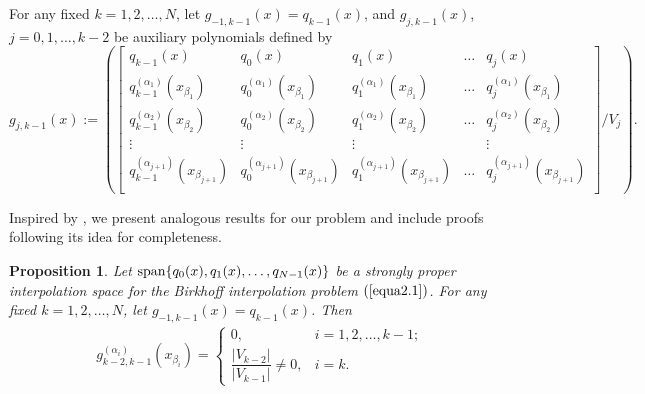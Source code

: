 \documentclass[preprint,12pt]{elsarticle}
\newtheorem{proposition}[theorem]{Proposition}
\begin{document}
For any fixed $k=1,2,\dots,N$, let $g_{-1,k-1}(x)=q_{k-1}(x)$, and $g_{j,k-1}(x)$, $j=0,1,\dots,k-2$ be auxiliary polynomials defined by
\begin{equation}\label{equa3.3}
g_{j,k-1}(x):= \left(\left[\begin{array}{c|cccc}
            q_{k-1}(x) & q_0(x) & q_1(x) & \dots & q_{j}(x) \\ \hline
            q_{k-1}^{(\alpha_1)}(x_{\beta_1}) & q_0^{(\alpha_1)}(x_{\beta_1}) & q_1^{(\alpha_1)}(x_{\beta_1}) & \dots & q_{j}^{(\alpha_1)}(x_{\beta_1}) \\
            q_{k-1}^{(\alpha_2)}(x_{\beta_2}) & q_0^{(\alpha_2)}(x_{\beta_2}) & q_1^{(\alpha_2)}(x_{\beta_2}) & \dots & q_{j}^{(\alpha_2)}(x_{\beta_2}) \\
            \vdots & \vdots & \vdots & ~ & \vdots \\
            q_{k-1}^{(\alpha_{j+1})}(x_{\beta_{j+1}}) & q_0^{(\alpha_{j+1})}(x_{\beta_{j+1}}) & q_1^{(\alpha_{j+1})}(x_{\beta_{j+1}}) & \dots & q_{j}^{(\alpha_{j+1})}(x_{\beta_{j+1}}) \\
            \end{array}\right]/V_{j}\right).
\end{equation}

Inspired by \cite{wen19,wen20},  we present analogous results for our problem and include proofs following its idea for completeness.

\begin{proposition}\label{prop:V.V}
Let $\textup{span}\{q_0(x), q_1(x),\dots,q_{N-1}(x)\}$ be a strongly proper interpolation space for the Birkhoff interpolation problem $(\ref{equa2.1})$. For any fixed $k=1,2,\dots,N$, let $g_{-1,k-1}(x)=q_{k-1}(x)$. Then  
\begin{align*}
    g_{k-2,k-1}^{(\alpha_i)}(x_{\beta_i})=\left\{
    \begin{array}{ll}
      0, & i=1,2,\dots,k-1; \\
      \dfrac{|V_{k-2}|}{|V_{k-1}|}\neq 0, & i=k.
    \end{array}
  \right.
\end{align*}
\end{proposition}
\end{document}
